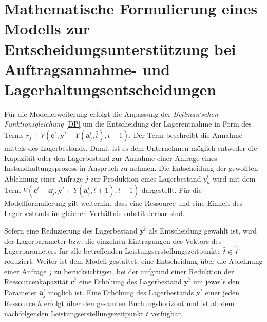 \section{Mathematische Formulierung eines Modells zur Entscheidungsunterstützung bei Auftragsannahme- und Lagerhaltungsentscheidungen}\label{Umformung}

Für die Modellerweiterung erfolgt die Anpassung der \textit{Bellman'schen Funktionsgleichung}  \eqref{DP} um die Entscheidung der Lagerentnahme in Form des Terms $r_{j} + V(\textbf{c}^{\hat t}, \textbf{y}^{\hat t}-Y(\textbf{a}_j^{\hat t}, \hat t), t-1)$. Der Term beschreibt die Annahme mittels des Lagerbestands. Damit ist es dem Unternehmen möglich entweder die Kapazität oder den Lagerbestand zur Annahme einer Anfrage eines Instandhaltungsprozess in Anspruch zu nehmen. Die Entscheidung der gewollten Ablehnung einer Anfrage $j$ zur Produktion eines Lagerbestand $y_h^{\hat t}$ wird mit dem Term $V(\textbf{c}^{\hat t}-\textbf{a}^{\hat t}_j, \textbf{y}^{\hat t}+Y(\textbf{a}^{\hat t}_j, \hat t +1), t-1)$ dargestellt. Für die Modellformulierung gilt weiterhin, dass eine Ressource und eine Einheit des Lagerbestands im gleichen Verhältnis substituierbar sind.

Sofern eine Reduzierung des Lagerbestand $\textbf{y}^{\hat t}$ als Entscheidung gewählt ist, wird der Lagerparameter bzw. die einzelnen Eintragungen des Vektors des Lagerparameters für alle betreffenden Leistungserstellungszeitpunkte $\hat t\in \hat T$ reduziert. Weiter ist dem Modell gestattet, eine Entscheidung über die Ablehnung einer Anfrage $j$ zu berücksichtigen, bei der aufgrund einer Reduktion der Ressourcenkapazität $\textbf{c}^{\hat t}$ eine Erhöhung des Lagerbestand $\textbf{y}^{\hat t}$ um jeweils den Parameter $\textbf{a}_j^{\hat t}$ möglich ist. Eine Erhöhung des Lagerbestands $\textbf{y}^{\hat t}$ einer jeden Ressource $h$ erfolgt über den gesamten Buchungshorizont und ist ab dem nachfolgenden Leistungserstellungszeitpunkt $\hat t$ verfügbar. %

